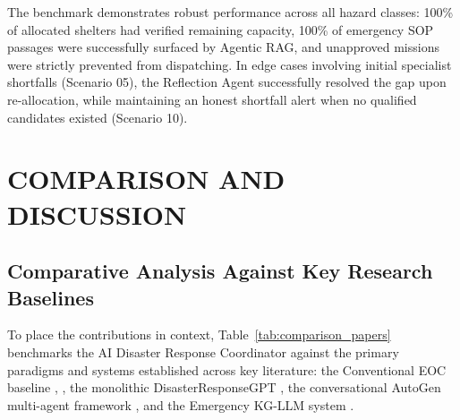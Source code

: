 \documentclass[conference]{IEEEtran}
\begin{document}
\begin{table}[htbp]
\caption{Evaluation Results Across 4 Primary Disaster Hazard Scenarios.}
\label{tab:scenario_eval}
\centering
{}
\end{table}

The benchmark demonstrates robust performance across all hazard classes: 100\% of allocated shelters had verified remaining capacity, 100\% of emergency SOP passages were successfully surfaced by Agentic RAG, and unapproved missions were strictly prevented from dispatching. In edge cases involving initial specialist shortfalls (Scenario 05), the Reflection Agent successfully resolved the gap upon re-allocation, while maintaining an honest shortfall alert when no qualified candidates existed (Scenario 10).

\section{COMPARISON AND DISCUSSION}
\subsection{Comparative Analysis Against Key Research Baselines}
To place the contributions in context, Table~\ref{tab:comparison_papers} benchmarks the AI Disaster Response Coordinator against the primary paradigms and systems established across key literature: the Conventional EOC baseline \cite{b12}, \cite{b13}, the monolithic DisasterResponseGPT \cite{b2}, the conversational AutoGen multi-agent framework \cite{b14}, and the Emergency KG-LLM system \cite{b15}.
\end{document}

